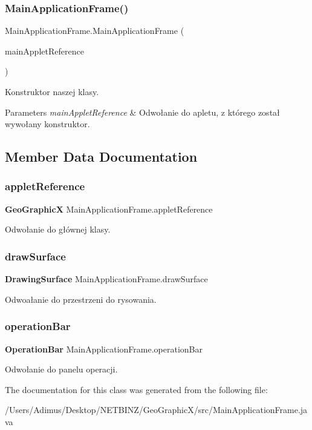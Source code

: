 \subsubsection{Main\+Application\+Frame()}
{\footnotesize\ttfamily Main\+Application\+Frame.\+Main\+Application\+Frame (\begin{DoxyParamCaption}\item[{\textbf{ Geo\+GraphicX}}]{main\+Applet\+Reference }\end{DoxyParamCaption})}

Konstruktor naszej klasy. 
\begin{DoxyParams}{Parameters}
{\em main\+Applet\+Reference} & Odwołanie do apletu, z którego został wywołany konstruktor. \\
\hline
\end{DoxyParams}


\subsection{Member Data Documentation}
\mbox{\label{class_main_application_frame_a505141826249708171cf2ef393051c2c}} 
\subsubsection{applet\+Reference}
{\footnotesize\ttfamily \textbf{ Geo\+GraphicX} Main\+Application\+Frame.\+applet\+Reference}

Odwołanie do głównej klasy. \mbox{\label{class_main_application_frame_a1a94fccde37da6545ea39c9f290f82b0}} 
\subsubsection{draw\+Surface}
{\footnotesize\ttfamily \textbf{ Drawing\+Surface} Main\+Application\+Frame.\+draw\+Surface}

Odwoałanie do przestrzeni do rysowania. \mbox{\label{class_main_application_frame_a8c7a1cc5cd71aa5f3af8c8e045877bdb}} 
\subsubsection{operation\+Bar}
{\footnotesize\ttfamily \textbf{ Operation\+Bar} Main\+Application\+Frame.\+operation\+Bar}

Odwołanie do panelu operacji. 

The documentation for this class was generated from the following file\+:\begin{DoxyCompactItemize}
\item 
/\+Users/\+Adimus/\+Desktop/\+N\+E\+T\+B\+I\+N\+Z/\+Geo\+Graphic\+X/src/Main\+Application\+Frame.\+java\end{DoxyCompactItemize}
